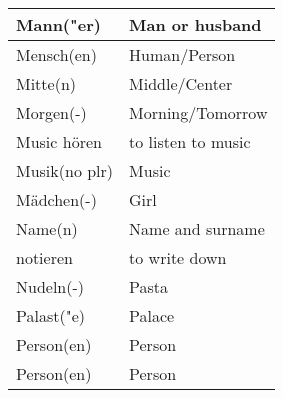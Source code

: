 \documentclass{article}
\begin{document}
\begin{minipage}{0.48\textwidth}
\begin{tabular}{|>{\raggedright\arraybackslash}p{3.5cm}|>{\raggedright\arraybackslash}p{3.5cm}|}
        Mann("er) & Man or husband \\\hline
        Mensch(en) & Human/Person \\\hline
        Mitte(n) & Middle/Center \\\hline
        Morgen(-) & Morning/Tomorrow \\\hline
        Music hören & to listen to music \\\hline
        Musik(no plr) & Music \\\hline
        Mädchen(-) & Girl \\\hline
        Name(n) & Name and surname \\\hline
        notieren & to write down \\\hline
        Nudeln(-) & Pasta \\\hline
        Palast("e) & Palace \\\hline
        Person(en) & Person \\\hline
        Person(en) & Person \\\hline
    \end{tabular}
\end{minipage}%
\hfill
\end{document}
